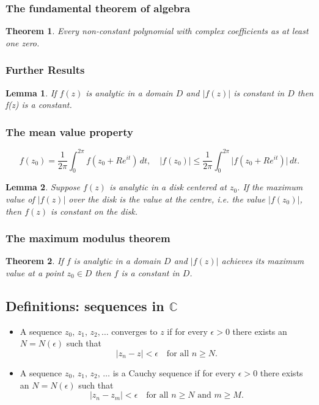 \documentclass{article}
\newtheorem{theorem}{Theorem}
\newtheorem{lemma}{Lemma}
\begin{document}
\subsubsection{The fundamental theorem of algebra}
\begin{theorem}
    Every non-constant polynomial with complex coefficients as at least one zero.
\end{theorem}

\subsubsection{Further Results}
\begin{lemma}
    If $f(z)$ is analytic in a domain $D$ and $\vert f(z)\vert$ is constant in $D$ then f(z) is a constant.
\end{lemma}
\subsubsection{The mean value property}
\begin{equation}
    f(z_0) = \frac{1}{2\pi} \int_0^{2\pi} f(z_0+Re^{it})\,dt,\quad \vert f(z_0)\vert \leq \frac{1}{2\pi} \int_0^{2\pi} \vert f(z_0+Re^{it})\vert\,dt.
\end{equation}
\begin{lemma}
    Suppose $f(z)$ is analytic in a disk centered at $z_0$. If the maximum value of $\vert f(z)\vert$ over the disk is the value at the centre, i.e. the value $\vert f(z_0)\vert$, then $f(z)$ is constant on the disk. 
\end{lemma}

\subsubsection{The maximum modulus theorem}
\begin{theorem}
    If $f$ is analytic in a domain $D$ and $\vert f(z)\vert$ achieves its maximum value at a point $z_0\in D$ then $f$ is a constant in $D$.
\end{theorem}


\subsection{Definitions: sequences in $\mathbb{C}$}
\begin{itemize}
    \item A sequence $z_0,\,z_1,\,z_2,\ldots$ converges to $z$ if for every $\epsilon>0$ there exists an $N = N(\epsilon)$ such that
    \begin{equation}
        \vert z_n-z\vert <\epsilon\quad\text{for all } n\geq N.
    \end{equation}
    \item A sequence $z_0,\,z_1,\,z_2,\,\ldots$ is a Cauchy sequence if for every $\epsilon>0$ there exists an $N=N(\epsilon)$ such that
    \begin{equation}
        \vert z_n-z_m\vert <\epsilon\quad\text{for all } n\geq N\text{ and } m\geq M.
    \end{equation}
\end{itemize}
\end{document}
